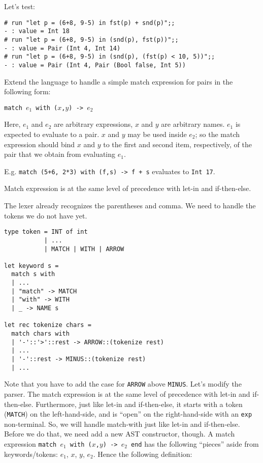 \documentclass[addpoints]{exam}
\begin{document}
\begin{questions}
\begin{solution}
    
    Let's test:
    \begin{verbatim}
# run "let p = (6+8, 9-5) in fst(p) + snd(p)";;
- : value = Int 18
# run "let p = (6+8, 9-5) in (snd(p), fst(p))";;
- : value = Pair (Int 4, Int 14)
# run "let p = (6+8, 9-5) in (snd(p), (fst(p) < 10, 5))";;
- : value = Pair (Int 4, Pair (Bool false, Int 5))
    \end{verbatim}
  \end{solution}

  
  \question
  Extend the language to handle
  a simple match expression for pairs in the following form:

  \texttt{match $e_1$ with ($x$,$y$) -> $e_2$}

  Here, $e_1$ and $e_2$ are arbitrary expressions,
  $x$ and $y$ are arbitrary names.
  $e_1$ is expected to evaluate to a pair.
  $x$ and $y$ may be used
  inside $e_2$; so the match expression should bind
  $x$ and $y$ to the first and second item, respectively,
  of the pair that we obtain from evaluating $e_1$.

  E.g. \texttt{match (5+6, 2*3) with (f,s) -> f + s}
  evaluates to \texttt{Int 17}.

  Match expression is at the same level of precedence with let-in
  and if-then-else.
  
  \begin{solution}
    The lexer already recognizes the parentheses and comma.
    We need to handle the tokens we do not have yet.

    \begin{verbatim}
type token = INT of int
           | ...
           | MATCH | WITH | ARROW

let keyword s =
  match s with
  | ...
  | "match" -> MATCH
  | "with" -> WITH
  | _ -> NAME s
  
let rec tokenize chars =
  match chars with
  | '-'::'>'::rest -> ARROW::(tokenize rest)
  | ...
  | '-'::rest -> MINUS::(tokenize rest)
  | ...
    \end{verbatim}

    Note that you have to add the case for \texttt{ARROW} above \texttt{MINUS}.
    Let's modify the parser.
    The match expression is at the same level of precedence with let-in and if-then-else.
    Furthermore, just like let-in and if-then-else, it starts with a token
    (\texttt{MATCH}) on the left-hand-side,
    and is ``open'' on the right-hand-side with an \texttt{exp} non-terminal.
    So, we will handle match-with just like let-in and if-then-else.
    Before we do that, we need add a new AST constructor, though.
    A match expression \texttt{match $e_1$ with ($x$,$y$) -> $e_2$ end}
    has the following ``pieces'' aside from keywords/tokens: $e_1$, $x$, $y$, $e_2$.
    Hence the following definition:


\end{solution}
\end{questions}
\end{document}
